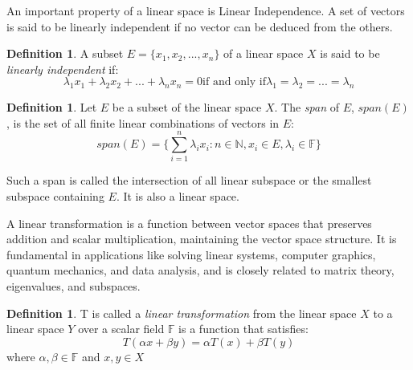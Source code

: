 \documentclass[12pt, reqno]{amsart}
\theoremstyle{definition}
\newtheorem{definition}[theorem]{Definition}
\numberwithin{equation}{section}
\newcommand{\dF}{{\mathbb F}}
\newcommand{\dN}{{\mathbb N}}
\begin{document}
An important property of a linear space is Linear Independence. A set of vectors is said to be linearly independent if no vector can be deduced from the others.
    \begin{definition}
        A subset $E = \{x_1, x_2,..., x_n\}$ of a linear space $X$ is said to be \textit{linearly independent} if:
        $$
        {\lambda_1}x_1+{\lambda_2}x_2 +...+{\lambda_n}x_n = 0 \text{if and only if} \lambda_1 = \lambda_2 = ... = \lambda_n
        $$
    \end{definition}
    
    \begin{definition}
        Let $E$ be a subset of the linear space $X$. The \textit{span} of $E$, $span(E)$, is the set of all finite linear combinations of vectors in $E$:\\
        $$
        span(E)= \{\sum_{i=1}^{n} {\lambda_i}x_i : n \in \dN, x_i \in E, \lambda_i \in \dF \}
        $$
    \end{definition}
    
Such a span is called the intersection of all linear subspace or the smallest subspace containing $E$. It is also a linear space.

A linear transformation is a function between vector spaces that preserves addition and scalar multiplication, maintaining the vector space structure. It is fundamental in applications like solving linear systems, computer graphics, quantum mechanics, and data analysis, and is closely related to matrix theory, eigenvalues, and subspaces.

    \begin{definition}
        T is called a \textit{linear transformation} from the linear space $X$ to a linear space $Y$ over a scalar field $\dF$ is a function that satisfies:    
        \[ T(\alpha x +\beta y) = \alpha T(x) + \beta T(y) \]      
        where $\alpha, \beta \in \dF$ and $x,y \in X$
    \end{definition}
\end{document}
